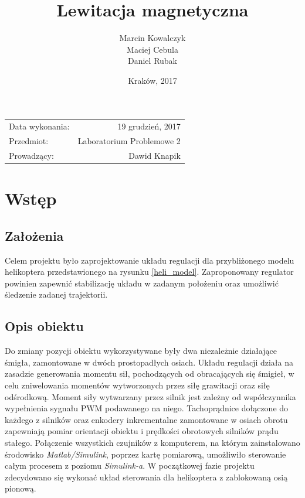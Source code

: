 \documentclass[11pt,a4paper]{article}
\title{\textbf{Lewitacja magnetyczna}} %
\author{Marcin Kowalczyk \\ Maciej Cebula \\ Daniel Rubak} %
\date{Kraków, 2017} %
\begin{document}
\maketitle %

\begin{center}
\begin{tabular}{l r}
Data wykonania: & 19 grudzień, 2017 \\ %
Przedmiot: & Laboratorium Problemowe 2 \\
Prowadzący: & Dawid Knapik %
\end{tabular}
\end{center}

\clearpage
\tableofcontents
\clearpage

\section{Wstęp}
\label{sec:wstep}
\subsection{Założenia}
Celem projektu było zaprojektowanie układu regulacji dla przybliżonego modelu helikoptera przedstawionego na rysunku \ref {heli_model}. Zaproponowany regulator powinien zapewnić stabilizację układu w zadanym położeniu oraz umożliwić śledzenie zadanej trajektorii. 
\subsection{Opis obiektu}
Do zmiany pozycji obiektu wykorzystywane były dwa niezależnie działające śmigła, zamontowane w dwóch prostopadłych osiach. Układu regulacji działa na zasadzie generowania momentu sił, pochodzących od obracających się śmigieł, w celu zniwelowania momentów wytworzonych przez siłę grawitacji oraz siłę odśrodkową. Moment siły wytwarzany przez silnik jest zależny od współczynnika wypełnienia sygnału PWM podawanego na niego. Tachoprądnice dołączone do każdego z silników oraz enkodery inkrementalne zamontowane w osiach obrotu  zapewniają pomiar orientacji obiektu i prędkości obrotowych silników prądu stałego. Połączenie wszystkich czujników z komputerem, na którym zainstalowano środowisko \textit{Matlab/Simulink}, poprzez kartę pomiarową, umożliwiło sterowanie całym procesem z poziomu \textit{Simulink-a}. W początkowej fazie projektu zdecydowano się wykonać układ sterowania dla helikoptera z zablokowaną osią pionową. 
\end{document}

